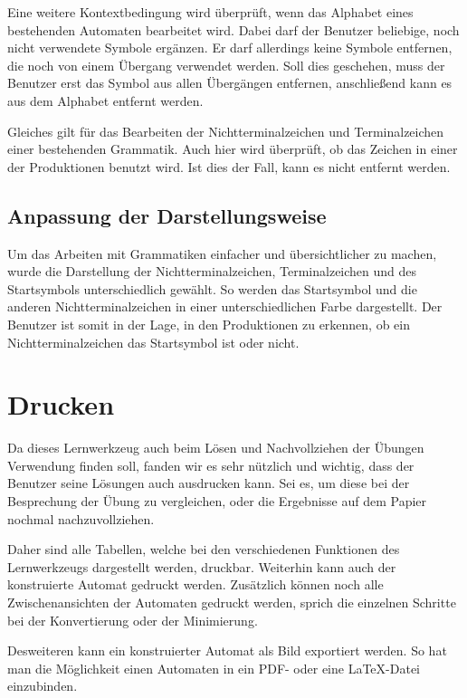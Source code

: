 Eine weitere Kontextbedingung wird überprüft, wenn das Alphabet eines
bestehenden Automaten bearbeitet wird. Dabei darf der Benutzer beliebige, 
noch nicht verwendete Symbole ergänzen. Er darf allerdings keine Symbole
entfernen, die noch von einem Übergang verwendet werden. Soll dies geschehen,
muss der Benutzer erst das Symbol aus allen Übergängen entfernen,
anschließend kann es aus dem Alphabet entfernt werden.\vspace{10pt}

Gleiches gilt für das Bearbeiten der Nichtterminalzeichen und Terminalzeichen
einer bestehenden Grammatik. Auch hier wird überprüft, ob das Zeichen in einer
der Produktionen benutzt wird. Ist dies der Fall, kann es nicht entfernt
werden.\vspace{10pt}


\subsection{Anpassung der Darstellungsweise}\label{ParserAdaption}

Um das Arbeiten mit Grammatiken einfacher und übersichtlicher zu machen, wurde
die Darstellung der Nichtterminalzeichen, Terminalzeichen und des Startsymbols
unterschiedlich gewählt. So werden das Startsymbol und die anderen
Nichtterminalzeichen in einer unterschiedlichen Farbe dargestellt. Der Benutzer
ist somit in der Lage, in den Produktionen zu erkennen, ob ein
Nichtterminalzeichen das Startsymbol ist oder nicht.\vspace{10pt}


\section{Drucken}\label{Print}

Da dieses Lernwerkzeug auch beim Lösen und Nachvollziehen der Übungen
Verwendung finden soll, fanden wir es sehr nützlich und wichtig, dass der
Benutzer seine Lösungen auch ausdrucken kann. Sei es, um diese bei der
Besprechung der Übung zu vergleichen, oder die Ergebnisse auf dem Papier
nochmal nachzuvollziehen.\vspace{10pt}

Daher sind alle Tabellen, welche bei den verschiedenen Funktionen des
Lernwerkzeugs dargestellt werden, druckbar. Weiterhin kann auch der konstruierte
Automat gedruckt werden. Zusätzlich können noch alle Zwischenansichten der
Automaten gedruckt werden, sprich die einzelnen Schritte bei der Konvertierung
oder der Minimierung.\vspace{10pt}

Desweiteren kann ein konstruierter Automat als Bild exportiert werden. So hat
man die Möglichkeit einen Automaten in ein PDF- oder eine \LaTeX -Datei
einzubinden.\vspace{10pt}


